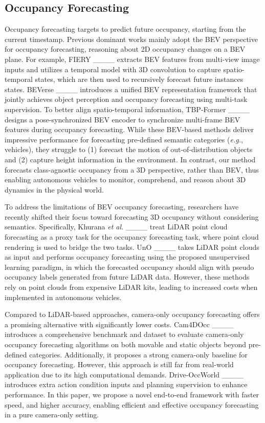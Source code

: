 \vspace{-3pt}
\subsection{Occupancy Forecasting}
\vspace{-3pt}

Occupancy forecasting targets to predict future occupancy, starting from the current timestamp. Previous dominant works mainly adopt the BEV perspective for occupancy forecasting, reasoning about 2D occupancy changes on a BEV plane. For example, FIERY ____ extracts BEV features from multi-view image inputs and utilizes a temporal model with 3D convolution to capture spatio-temporal states, which are then used to recursively forecast future instances states. BEVerse ____ introduces a unified BEV representation framework that jointly achieves object perception and occupancy forecasting using multi-task supervision. To better align spatio-temporal information, TBP-Former ____ designs a pose-synchronized BEV encoder to synchronize multi-frame BEV features during occupancy forecasting. While these BEV-based methods deliver impressive performance for forecasting pre-defined semantic categories (\textit{e.g.}, vehicles), they struggle to (1) forecast the motion of out-of-distribution objects and (2) capture height information in the environment. In contrast, our method forecasts class-agnostic occupancy from a 3D perspective, rather than BEV, thus enabling autonomous vehicles to monitor, comprehend, and reason about 3D dynamics in the physical world. 

To address the limitations of BEV occupancy forecasting, researchers have recently shifted their focus toward forecasting 3D occupancy without considering semantics. 
Specifically, Khurana \textit{et al.} ____ treat LiDAR point cloud forecasting as a proxy task for the occupancy forecasting task, where point cloud rendering is used to bridge the two tasks. UnO ____ takes LiDAR point clouds as input and performs occupancy forecasting using the proposed unsupervised learning paradigm, in which the forecasted occupancy should align with pseudo occupancy labels generated from future LiDAR data. However, these methods rely on point clouds from expensive LiDAR kits, leading to increased costs when implemented in autonomous vehicles. 

Compared to LiDAR-based approaches, camera-only occupancy forecasting offers a promising alternative with significantly lower costs. Cam4DOcc ____ introduces a comprehensive benchmark and dataset to evaluate camera-only occupancy forecasting algorithms on both movable and static objects beyond pre-defined categories. Additionally, it proposes a strong camera-only baseline for occupancy forecasting.  However, this approach is still far from real-world application due to its high computational demands. Drive-OccWorld ____ introduces extra action condition inputs and planning supervision to enhance performance. In this paper, we propose a novel end-to-end framework with faster speed, and higher accuracy, enabling efficient and effective occupancy forecasting in a pure camera-only setting.

\vspace{-3pt}